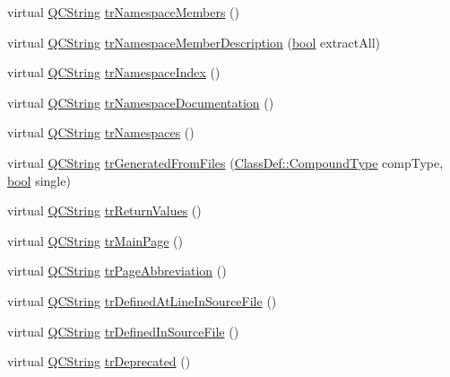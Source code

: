 \begin{DoxyCompactItemize}
\item 
virtual \hyperlink{class_q_c_string}{Q\+C\+String} \hyperlink{class_translator_portuguese_a9744a501cca3572f9c069c321abab9cf}{tr\+Namespace\+Members} ()
\item 
virtual \hyperlink{class_q_c_string}{Q\+C\+String} \hyperlink{class_translator_portuguese_adcd31f154058950cfc7035282f6599fb}{tr\+Namespace\+Member\+Description} (\hyperlink{qglobal_8h_a1062901a7428fdd9c7f180f5e01ea056}{bool} extract\+All)
\item 
virtual \hyperlink{class_q_c_string}{Q\+C\+String} \hyperlink{class_translator_portuguese_a99cccfbd85b7dd8610e9cd4647dccfa3}{tr\+Namespace\+Index} ()
\item 
virtual \hyperlink{class_q_c_string}{Q\+C\+String} \hyperlink{class_translator_portuguese_adcbf36c3e119120b2b48b87eb20384eb}{tr\+Namespace\+Documentation} ()
\item 
virtual \hyperlink{class_q_c_string}{Q\+C\+String} \hyperlink{class_translator_portuguese_ae023699a28ee15d6f616775c819a2e3a}{tr\+Namespaces} ()
\item 
virtual \hyperlink{class_q_c_string}{Q\+C\+String} \hyperlink{class_translator_portuguese_a8bc2494fc389b136706de6fd93d8547f}{tr\+Generated\+From\+Files} (\hyperlink{class_class_def_ae70cf86d35fe954a94c566fbcfc87939}{Class\+Def\+::\+Compound\+Type} comp\+Type, \hyperlink{qglobal_8h_a1062901a7428fdd9c7f180f5e01ea056}{bool} single)
\item 
virtual \hyperlink{class_q_c_string}{Q\+C\+String} \hyperlink{class_translator_portuguese_ac68e39b588ad262e332b86eb9af5f77e}{tr\+Return\+Values} ()
\item 
virtual \hyperlink{class_q_c_string}{Q\+C\+String} \hyperlink{class_translator_portuguese_a213360091f1c3ab1ab95de2abf1c7a34}{tr\+Main\+Page} ()
\item 
virtual \hyperlink{class_q_c_string}{Q\+C\+String} \hyperlink{class_translator_portuguese_a14ece07610419a00727fcd6fd852d556}{tr\+Page\+Abbreviation} ()
\item 
virtual \hyperlink{class_q_c_string}{Q\+C\+String} \hyperlink{class_translator_portuguese_ac221da9032740897823818dc88a3a820}{tr\+Defined\+At\+Line\+In\+Source\+File} ()
\item 
virtual \hyperlink{class_q_c_string}{Q\+C\+String} \hyperlink{class_translator_portuguese_a228ade90dcb3e124fb0aca0bb1bb1657}{tr\+Defined\+In\+Source\+File} ()
\item 
virtual \hyperlink{class_q_c_string}{Q\+C\+String} \hyperlink{class_translator_portuguese_afcebfa5c732d5f8fbe0fa7d701b4e5cf}{tr\+Deprecated} ()

\end{DoxyCompactItemize}
